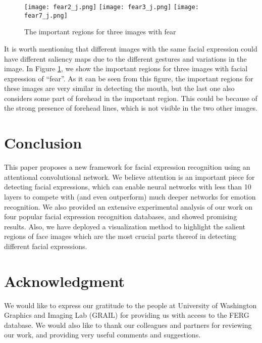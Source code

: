 \documentclass[conference]{IEEEtran}
\begin{document}
\begin{figure}[h]
\begin{center}
   \texttt{[image: fear2\_j.png]}
   \texttt{[image: fear3\_j.png]}
   \texttt{[image: fear7\_j.png]}
\end{center}
   \caption{The important regions for three images with fear}
\label{fig:SaliencyFear}
\end{figure}

It is worth mentioning that different images with the same facial expression could have different saliency maps due to the different gestures and variations in the image. 
In Figure \ref{fig:SaliencyFear}, we show the important regions for three images with facial expression of ``fear''. 
As it can be seen from this figure, the important regions for these images are very similar in detecting the mouth, but the last one also considers some part of forehead in the important region. 
This could be because of the strong presence of forehead lines, which is not visible in the two other images. 






\section{Conclusion}
This paper proposes a new framework for facial expression recognition using an attentional convolutional network.
We believe attention is an important piece for detecting facial expressions, which can enable neural networks with less than 10 layers to compete with (and even outperform) much deeper networks for emotion recognition.
We also provided an extensive experimental analysis of our work on four popular facial expression recognition databases, and showed promising results.
Also, we have deployed a visualization method to highlight the salient regions of face images which are the most crucial parts thereof in detecting different facial expressions.


\section*{Acknowledgment}
We would like to express our gratitude to the people at University of Washington Graphics and Imaging Lab (GRAIL) for providing us with access to the FERG database.
We would also like to thank our colleagues and partners for reviewing our work, and providing very useful comments and suggestions.
\end{document}
